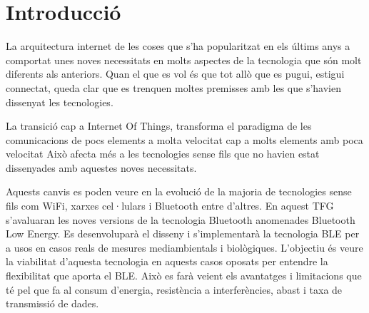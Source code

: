 \cleardoublepage
{}
\chapter*{Introducció}
La arquitectura internet de les coses que s'ha popularitzat en els últims anys a comportat unes noves necessitats en molts aspectes de la tecnologia que són molt diferents als anteriors.
Quan el que es vol és que tot allò que es pugui, estigui connectat, queda clar que es trenquen moltes premisses amb les que s'havien dissenyat les tecnologies.

La transició cap a Internet Of Things, transforma el paradigma de les comunicacions de pocs elements a molta velocitat cap a molts elements amb poca velocitat
 Això afecta més a les tecnologies sense fils que no havien estat dissenyades amb aquestes noves necessitats.

Aquests canvis es poden veure en la evolució de la majoria de tecnologies sense fils com WiFi, xarxes cel·lulars i Bluetooth entre d'altres.
En aquest TFG s'avaluaran les noves versions de la tecnologia Bluetooth anomenades Bluetooth Low Energy.
Es desenvoluparà el disseny i s'implementarà la tecnologia BLE per a usos en casos reals de mesures mediambientals i biològiques.
L'objectiu és veure la viabilitat d'aquesta tecnologia en aquests casos oposats per entendre la flexibilitat que aporta el BLE.
Això es farà veient els avantatges i limitacions que té pel que fa al consum d'energia, resistència a interferències, abast i taxa de transmissió de dades.